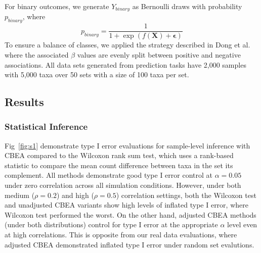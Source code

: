 \documentclass{article}
\begin{document}
For binary outcomes, we generate $Y_{binary}$ as Bernoulli draws with probability $p_{binary}$, where 
\begin{equation}
    p_{binary} = \frac{1}{1 + \exp(f(\mathbf{X}) + \mathbf{\epsilon})}
\end{equation}
To ensure a balance of classes, we applied the strategy described in Dong et al. \cite{dong2020} where the associated $\beta$ values are evenly split between positive and negative associations. All data sets generated from prediction tasks have 2,000 samples with 5,000 taxa over 50 sets with a size of 100 taxa per set.

\subsection{Results} 
\subsubsection{Statistical Inference}
Fig~\ref{fig:s1} demonstrate type I error evaluations for sample-level inference with CBEA compared to the Wilcoxon rank sum test, which uses a rank-based statistic to compare the mean count difference between taxa in the set its complement. All methods demonstrate good type I error control at $\alpha = 0.05$ under zero correlation across all simulation conditions. However, under both medium ($\rho = 0.2$) and high ($\rho = 0.5$) correlation settings, both the Wilcoxon test and unadjusted CBEA variants show high levels of inflated type I error, where Wilcoxon test performed the worst. On the other hand, adjusted CBEA methods (under both distributions) control for type I error at the appropriate $\alpha$ level even at high correlations. This is opposite from our real data evaluations, where adjusted CBEA demonstrated inflated type I error under random set evalutions.  
\end{document}
